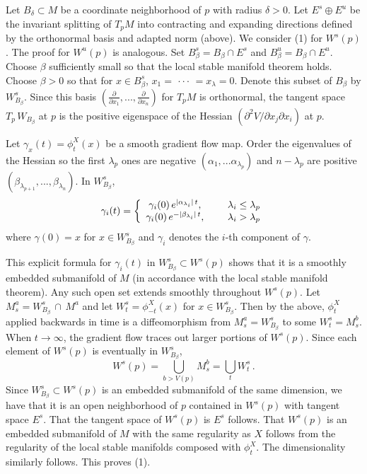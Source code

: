 \documentclass[12pt]{article}
\begin{document}
    Let $B_{\delta} \subset M$ be a coordinate neighborhood of $p$ with radius $\delta > 0$. Let $E^s \oplus E^u$ be the invariant splitting of $T_pM$ into contracting and expanding directions defined by the orthonormal basis and adapted norm (above). We consider (1) for $W^s(p)$. The proof for $W^u(p)$ is analogous. Set $B^s_{\beta} = B_{\beta} \cap E^s$ and $B^u_{\beta} = B_{\beta} \cap E^u$. Choose $\beta$ sufficiently small so that the local stable manifold theorem holds. Choose $\beta >0$ so that for $x \in B^s_{\beta}$, $x_1 = \, \cdot \cdot \cdot \, = x_{\lambda} = 0$. Denote this subset of $B_{\beta}$ by $W_{B_{\beta}}^s$. Since this basis $\left( \frac{\partial}{\partial x_1}, ..., \frac{\partial}{\partial x_n} \right)$ for $T_pM$ is orthonormal, the tangent space $T_p \, W_{B_{\beta}}$ at $p$ is the positive eigenspace of the Hessian $\left( \partial ^2 V / \partial x_j \partial x_i \right)$ at $p$. 
    
    Let $\gamma_x(t) = \phi^X_t(x)$ be a smooth gradient flow map. Order the eigenvalues of the Hessian so the first $\lambda_p$ ones are negative $(\alpha_1,...\alpha_{\lambda_p})$ and $n-\lambda_p$ are positive $(\beta_{\lambda_{p+1}},...,\beta_{\lambda_{n}})$. In $W_{B_{\beta}}^s$,
    \begin{equation*}
        \gamma_i(t) =\left\{ \begin{array}{cc} 
                \gamma_i(0) \,e^{|\alpha_{\lambda_i} |\,t}, & \hspace{5mm} \lambda_i \leq \lambda_p \\
                \gamma_i(0)\,e^{-|\beta_{\lambda_{i}} |\,t}, & \hspace{5mm} \lambda_i > \lambda_p \\
                \end{array} \right. 
    \end{equation*}
    where $\gamma(0)=x$ for $x \in W_{B_{\beta}}^s$ and $\gamma_i$ denotes the $i$-th component of $\gamma$.
    
    This explicit formula for $\gamma_i(t)$ in $W_{B_{\beta}}^s \subset W^s(p)$ shows that it is a smoothly embedded submanifold of $M$ (in accordance with the local stable manifold theorem). Any such open set extends smoothly throughout $W^s(p)$. Let $M^a_s = W_{B_{\beta}}^s \, \cap \, M^a$ and let $W_t^s = \phi_{-t}^X (x)$ for $x \in W_{B_{\beta}}^s$. Then by the above, $\phi^X_t$ applied backwards in time is a diffeomorphism from $M^a_s = W_{B_{\beta}}^s$ to some $W_t^s = M^b_s$. When $t \rightarrow \infty$, the gradient flow traces out larger portions of $W^s(p)$. Since each element of $W^s(p)$ is eventually in $W_{B_{\beta}}^s$,
    \begin{equation*}
        W^s(p) = \bigcup_{b>V(p)} M^b_s = \bigcup_{t} W^s_t \,.
    \end{equation*}
    Since $W_{B_{\beta}}^s \subset W^s(p)$ is an embedded submanifold of the same dimension, we have that it is an open neighborhood of $p$ contained in $W^s(p)$ with tangent space $E^s$. That the tangent space of $W^s(p)$ is $E^s$ follows. That $W^s(p)$ is an embedded submanifold of $M$ with the same regularity as $X$ follows from the regularity of the local stable manifolds composed with $\phi_t^X$. The dimensionality similarly follows. This proves (1).
\end{document}
